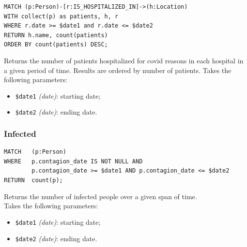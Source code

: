 \documentclass[12pt, a4paper]{article}
\begin{document}
\begin{tcolorbox}[fontupper=\scriptsize]
    \begin{verbatim}
MATCH (p:Person)-[r:IS_HOSPITALIZED_IN]->(h:Location)
WITH collect(p) as patients, h, r
WHERE r.date >= $date1 and r.date <= $date2
RETURN h.name, count(patients)
ORDER BY count(patients) DESC;
    \end{verbatim}
\end{tcolorbox}

\noindent %
Returns the number of patients hospitalized for covid reasons in each hospital in a given period of time.
Results are ordered by number of patients.
Takes the following parameters: 
\begin{itemize}
    \item \texttt{\$date1} \emph{(date)}: starting date;
    \item \texttt{\$date2} \emph{(date)}: ending date.
\end{itemize}

\subsubsection{Infected}
\begin{tcolorbox}[fontupper=\scriptsize]
    \begin{verbatim}
MATCH   (p:Person)
WHERE   p.contagion_date IS NOT NULL AND
        p.contagion_date >= $date1 AND p.contagion_date <= $date2
RETURN  count(p);
    \end{verbatim}
\end{tcolorbox}

\noindent %
Returns the number of infected people over a given span of time. \\
Takes the following parameters: 
\begin{itemize}
    \item \texttt{\$date1} \emph{(date)}: starting date;
    \item \texttt{\$date2} \emph{(date)}: ending date.
\end{itemize}
\end{document}
